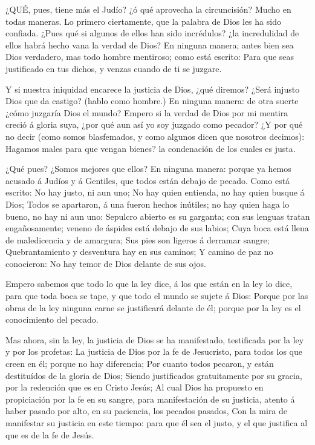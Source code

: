  ¿QUÉ, pues, tiene más el Judío? ¿ó qué aprovecha la
circuncisión?  Mucho en todas maneras. Lo primero
ciertamente, que la palabra de Dios les ha sido confiada. 
¿Pues qué si algunos de ellos han sido incrédulos? ¿la incredulidad de
ellos habrá hecho vana la verdad de Dios?  En ninguna
manera; antes bien sea Dios verdadero, mas todo hombre mentiroso; como
está escrito: Para que seas justificado en tus dichos, y venzas cuando
de ti se juzgare.

 Y si nuestra iniquidad encarece la justicia de Dios, ¿qué
diremos? ¿Será injusto Dios que da castigo? (hablo como hombre.)
 En ninguna manera: de otra suerte ¿cómo juzgaría Dios el
mundo?  Empero si la verdad de Dios por mi mentira creció á
gloria suya, ¿por qué aun así yo soy juzgado como pecador? 
¿Y por qué no decir (como somos blasfemados, y como algunos dicen que
nosotros decimos): Hagamos males para que vengan bienes? la condenación
de los cuales es justa.

 ¿Qué pues? ¿Somos mejores que ellos? En ninguna manera:
porque ya hemos acusado á Judíos y á Gentiles, que todos están debajo de
pecado.  Como está escrito: No hay justo, ni aun uno;
 No hay quien entienda, no hay quien busque á Dios;
 Todos se apartaron, á una fueron hechos inútiles; no hay
quien haga lo bueno, no hay ni aun uno:  Sepulcro abierto
es su garganta; con sus lenguas tratan engañosamente; veneno de áspides
está debajo de sus labios;  Cuya boca está llena de
maledicencia y de amargura;  Sus pies son ligeros á
derramar sangre;  Quebrantamiento y desventura hay en sus
caminos;  Y camino de paz no conocieron:  No
hay temor de Dios delante de sus ojos.

 Empero sabemos que todo lo que la ley dice, á los que
están en la ley lo dice, para que toda boca se tape, y que todo el mundo
se sujete á Dios:  Porque por las obras de la ley ninguna
carne se justificará delante de él; porque por la ley es el conocimiento
del pecado.

 Mas ahora, sin la ley, la justicia de Dios se ha
manifestado, testificada por la ley y por los profetas:  La
justicia de Dios por la fe de Jesucristo, para todos los que creen en
él; porque no hay diferencia;  Por cuanto todos pecaron, y
están destituídos de la gloria de Dios;  Siendo
justificados gratuitamente por su gracia, por la redención que es en
Cristo Jesús;  Al cual Dios ha propuesto en propiciación
por la fe en su sangre, para manifestación de su justicia, atento á
haber pasado por alto, en su paciencia, los pecados pasados,
 Con la mira de manifestar su justicia en este tiempo: para
que él sea el justo, y el que justifica al que es de la fe de Jesús.

